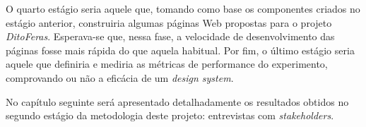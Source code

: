 O quarto estágio seria aquele que, tomando como base os componentes criados no estágio anterior, construiria algumas páginas Web propostas para o projeto \textit{DitoFeras}. Esperava-se que, nessa fase, a velocidade de desenvolvimento das páginas fosse mais rápida do que aquela habitual. Por fim, o último estágio seria aquele que definiria e mediria as métricas de performance do experimento, comprovando ou não a eficácia de um \textit{design system}.

No capítulo seguinte será apresentado detalhadamente os resultados obtidos no segundo estágio da metodologia deste projeto: entrevistas com \textit{stakeholders}.
